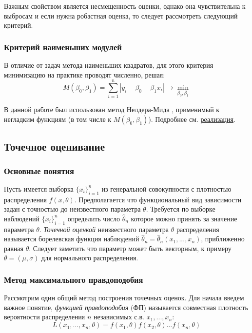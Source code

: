 \documentclass[12pt,a4paper]{article}
\begin{document}
Важным свойством является несмещенность оценки, однако она чувствительна к выбросам и если нужна робастная оценка, то следует рассмотреть следующий критерий.

\subsubsection{Критерий наименьших модулей}
В отличие от задач метода наименьших квадратов, для этого критерия минимизацию на практике проводят численно, решая:
\begin{equation}\label{lab6:2}
M\left(\beta_{0}, \beta_{1}\right)=\sum_{i=1}^{n}\left|y_{i}-\beta_{0}-\beta_{1} x_{i}\right| \rightarrow \min _{\beta_{0}, \beta_{1}}
\end{equation}

В данной работе был использован метод Нелдера-Мида \cite{nelder}, применимый к негладким функциям (в том числе к $M\left(\beta_{0}, \beta_{1}\right)$). Подробнее см. \hyperref[sec:impl]{реализация}.

\subsection{Точечное оценивание}
\subsubsection{Основные понятия}
Пусть имеется выборка $\{x_i\}_{i=1}^n$ из генеральной совокупности с плотностью распределения $f(x,\theta)$. Предполагается что функциональный вид зависимости задан с точностью до неизвестного параметра $\theta$. Требуется по выборке наблюдений $\{x_i\}_{i=1}^n$ определить число $\widehat{\theta}_n$ которое можно принять за значение параметра $\theta$. \textit{Точечной оценкой} неизвестного параметра $\theta$ распределения называется борелевская функция наблюдений $\widehat{\theta}_n = \widehat{\theta}_n(x_1, ..., x_n)$, приближенно равная $\theta$. Следует заметить что параметр может быть векторным, к примеру $\theta = (\mu, \sigma)$ для нормального распределения.

\subsubsection{Метод максимального правдоподобия}
Рассмотрим один общий метод построения точечных оценок. Для начала введем важное понятие, \textit{функцией правдоподобия} (ФП) называется совместная плотность вероятности распределения $n$ независимых с.в. $x_1, ..., x_n$:
\begin{equation}
L\left(x_{1}, \ldots, x_{n}, \theta\right)=f\left(x_{1}, \theta\right) f\left(x_{2}, \theta\right) \ldots f\left(x_{n}, \theta\right)
\end{equation}
\end{document}
